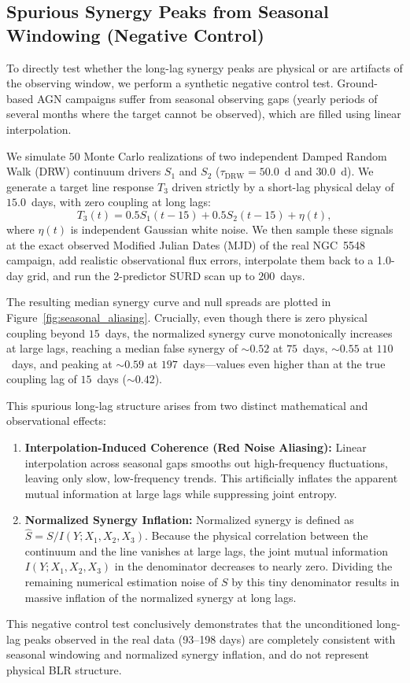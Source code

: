 \documentclass[fleqn,usenatbib]{mnras}
\begin{document}
\subsection{Spurious Synergy Peaks from Seasonal Windowing (Negative Control)}
\label{sec:seasonal_aliasing_test}

To directly test whether the long-lag synergy peaks are physical or are artifacts of the observing window, we perform a synthetic negative control test. Ground-based AGN campaigns suffer from seasonal observing gaps (yearly periods of several months where the target cannot be observed), which are filled using linear interpolation.

We simulate $50$ Monte Carlo realizations of two independent Damped Random Walk (DRW) continuum drivers $S_1$ and $S_2$ ($\tau_{\mathrm{DRW}} = 50.0$~d and $30.0$~d). We generate a target line response $T_3$ driven strictly by a short-lag physical delay of $15.0$~days, with zero coupling at long lags:
\begin{equation}
T_3(t) = 0.5 S_1(t-15) + 0.5 S_2(t-15) + \eta(t),
\end{equation}
where $\eta(t)$ is independent Gaussian white noise. We then sample these signals at the exact observed Modified Julian Dates (MJD) of the real NGC~5548 campaign, add realistic observational flux errors, interpolate them back to a 1.0-day grid, and run the 2-predictor SURD scan up to $200$~days.

The resulting median synergy curve and null spreads are plotted in Figure~\ref{fig:seasonal_aliasing}. Crucially, even though there is zero physical coupling beyond $15$~days, the normalized synergy curve monotonically increases at large lags, reaching a median false synergy of $\sim 0.52$ at $75$~days, $\sim 0.55$ at $110$~days, and peaking at $\sim 0.59$ at $197$~days---values even higher than at the true coupling lag of $15$~days ($\sim 0.42$).

This spurious long-lag structure arises from two distinct mathematical and observational effects:
\begin{enumerate}
    \item \textbf{Interpolation-Induced Coherence (Red Noise Aliasing):} Linear interpolation across seasonal gaps smooths out high-frequency fluctuations, leaving only slow, low-frequency trends. This artificially inflates the apparent mutual information at large lags while suppressing joint entropy.
    \item \textbf{Normalized Synergy Inflation:} Normalized synergy is defined as $\widehat{S} = S / I(Y; X_1, X_2, X_3)$. Because the physical correlation between the continuum and the line vanishes at large lags, the joint mutual information $I(Y; X_1, X_2, X_3)$ in the denominator decreases to nearly zero. Dividing the remaining numerical estimation noise of $S$ by this tiny denominator results in massive inflation of the normalized synergy at long lags.
\end{enumerate}
This negative control test conclusively demonstrates that the unconditioned long-lag peaks observed in the real data (93--198 days) are completely consistent with seasonal windowing and normalized synergy inflation, and do not represent physical BLR structure.
\end{document}
